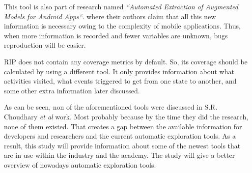 This tool is also part of research named \textit{``Automated Extraction of Augmented Models for Android Apps``}. where their authors claim that all this new information is necessary owing to the complexity of mobile applications. Thus, when more information is recorded and fewer variables are unknown, bugs reproduction will be easier.

RIP does not contain any coverage metrics by default. So, its coverage should be calculated by using a different tool. It only provides information about what activities visited, what events triggered to get from one state to another, and some other extra information later discussed.

As can be seen, non of the aforementioned tools were discussed in S.R. Choudhary \textit{et al} \cite{Choudhary} work. Most probably because by the time they did the research, none of them existed. That creates a gap between the available information for developers and researchers and the current automatic exploration tools. As a result, this study will provide information about some of the newest tools that are in use within the industry and the academy.  The study will give a better overview of nowadays automatic exploration tools.
